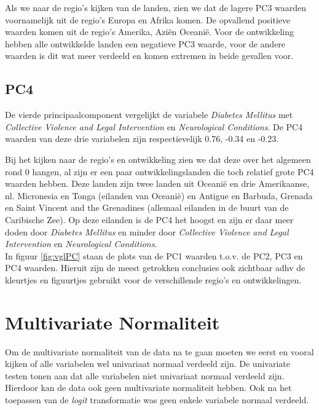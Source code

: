 \documentclass[a4paper,kulak]{kulakarticle}
\begin{document}
Als we naar de regio's kijken van de landen, zien we dat de lagere PC3 waarden voornamelijk uit de regio's Europa en Afrika komen. De opvallend positieve waarden komen uit de regio's Amerika, Azi\" en Oceani\"e. Voor de ontwikkeling hebben alle ontwikkelde landen een negatieve PC3 waarde, voor de andere waarden is dit wat meer verdeeld en komen extremen in beide gevallen voor. 

\subsection{PC4}
De vierde principaalcomponent vergelijkt de variabele \textit{Diabetes Mellitus} met \textit{Collective Violence and Legal Intervention} en \textit{Neurological Conditions}. De PC4 waarden van deze drie variabelen zijn respectievelijk 0.76, -0.34 en -0.23. 

Bij het kijken naar de regio's en ontwikkeling zien we dat deze over het algemeen rond 0 hangen, al zijn er een paar ontwikkelingslanden die toch relatief grote PC4 waarden hebben. Deze landen zijn twee landen uit Oceani\"e en drie Amerikaanse, nl.  Micronesia en Tonga (eilanden van Oceani\"e) en Antigue en Barbuda, Grenada en Saint Vincent and the Grenadines (allemaal eilanden in de buurt van de Caribische Zee). Op deze eilanden is de PC4 het hoogst en zijn er daar meer doden door \textit{Diabetes Mellitus} en minder door \textit{Collective Violence and Legal Intervention} en \textit{Neurological Conditions}.\\

In figuur \ref{fig:vglPC} staan de plots van de PC1 waarden t.o.v. de PC2, PC3 en PC4 waarden. Hieruit zijn de meest getrokken conclusies ook zichtbaar adhv de kleurtjes en figuurtjes gebruikt voor de verschillende regio's en ontwikkelingen. 

\section{Multivariate Normaliteit}
Om de multivariate normaliteit van de data na te gaan moeten we eerst en vooral kijken of alle variabelen wel univariaat normaal verdeeld zijn. De univariate testen tonen aan dat alle variabelen niet univariaat normaal verdeeld zijn. Hierdoor kan de data ook geen multivariate normaliteit hebben. Ook na het toepassen van de \textit{logit} transformatie was geen enkele variabele normaal verdeeld. 
\end{document}
